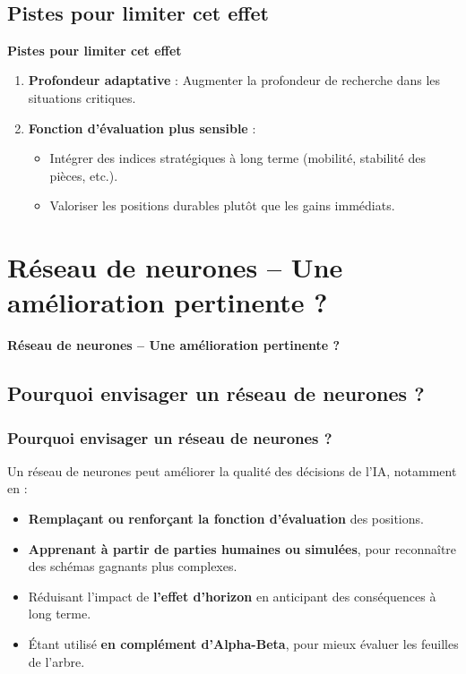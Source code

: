 \documentclass[9pt]{beamer}
\begin{document}
\begin{frame}
  ~

  \subsection{Pistes pour limiter cet effet}
  \textbf{Pistes pour limiter cet effet}
  \begin{enumerate}
    \item \textbf{Profondeur adaptative} : Augmenter la profondeur de recherche dans les situations critiques.
    \item \textbf{Fonction d’évaluation plus sensible} : 
    \begin{itemize}
      \item Intégrer des indices stratégiques à long terme (mobilité, stabilité des pièces, etc.).
      \item Valoriser les positions durables plutôt que les gains immédiats.
    \end{itemize}
  \end{enumerate}
\end{frame}

\section{Réseau de neurones – Une amélioration pertinente ?}
\begin{frame}
  \begin{center}
      \Large \textbf{Réseau de neurones – Une amélioration pertinente ?}
  \end{center}
\end{frame}

\subsection{Pourquoi envisager un réseau de neurones ?}
\begin{frame}
      \frametitle{Pourquoi envisager un réseau de neurones ?}
      Un réseau de neurones peut améliorer la qualité des décisions de l’IA, notamment en :

      \begin{itemize}
        \item \textbf{Remplaçant ou renforçant la fonction d’évaluation} des positions.
        \item \textbf{Apprenant à partir de parties humaines ou simulées}, pour reconnaître des schémas gagnants plus complexes.
        \item Réduisant l’impact de \textbf{l’effet d’horizon} en anticipant des conséquences à long terme.
        \item Étant utilisé \textbf{en complément d’Alpha-Beta}, pour mieux évaluer les feuilles de l’arbre.
      \end{itemize}
\end{frame}
\end{document}
